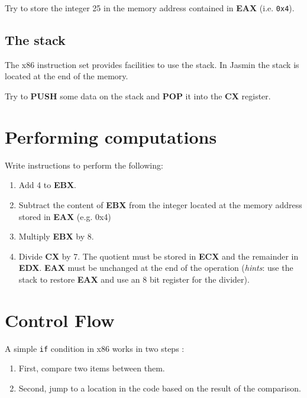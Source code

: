 \documentclass[a4paper, 11pt]{article}
\newenvironment{instruction}%
{\vspace{15pt}
	\noindent\begin{Sbox}
		\begin{minipage}{\textwidth}}%
		{\end{minipage}
	\end{Sbox}	
\shadowbox{\TheSbox} \vspace{10pt}}
\newcommand{\asmop}[1]{{\sffamily \bfseries \color{asmblue} #1}}
\newcommand{\asmreg}[1]{{\sffamily \bfseries \color{asmgreen} #1}}
\begin{document}
\begin{instruction}
	Try to store the integer 25 in the memory address contained in \asmreg{EAX} (i.e. \texttt{0x4}).
\end{instruction}


\subsection{The stack}

The x86 instruction set provides facilities to use the stack. In \textsf{Jasmin} the stack is located at the end of the memory. 

\begin{instruction}
	Try to \asmop{PUSH} some data on the stack and \asmop{POP} it into the \asmreg{CX} register.
\end{instruction}


\section{Performing computations}


\begin{instruction}
	Write instructions to perform the following:
	\begin{enumerate}
		\item Add 4 to \asmreg{EBX}.
		\item Subtract the content of \asmreg{EBX} from the integer located at the memory address stored in \asmreg{EAX} (e.g. 0x4)
		\item Multiply \asmreg{EBX} by 8.
		\item Divide \asmreg{CX} by 7. The quotient must be stored in \asmreg{ECX} and the remainder in \asmreg{EDX}.
		\asmreg{EAX} must be unchanged at the end of the operation 
		(\emph{hints}: use the stack to restore \asmreg{EAX} and use an 8 bit register for the divider).
	\end{enumerate}
\end{instruction}


\section{Control Flow}

A simple \texttt{if} condition in x86 works in two steps : 
\begin{enumerate}
	\item First, compare two items between them.
	\item Second, jump to a location in the code based on the result of the comparison.
\end{enumerate}
\end{document}
